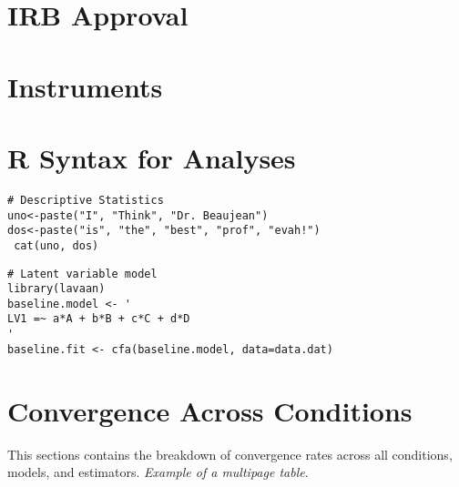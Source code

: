 \chapter{IRB Approval}

\chapter{Instruments}

\chapter{R Syntax for Analyses} \label{ap:RSyntax}


\begin{lstlisting}
# Descriptive Statistics
uno<-paste("I", "Think", "Dr. Beaujean")
dos<-paste("is", "the", "best", "prof", "evah!")
 cat(uno, dos)
\end{lstlisting}

\begin{lstlisting}
# Latent variable model
library(lavaan)
baseline.model <- '
LV1 =~ a*A + b*B + c*C + d*D
'
baseline.fit <- cfa(baseline.model, data=data.dat)
\end{lstlisting}


\chapter{Convergence Across Conditions}
\label{app:con}

This sections contains the breakdown of convergence rates across all conditions, models, and estimators.
\textit{Example of a multipage table}.
 
